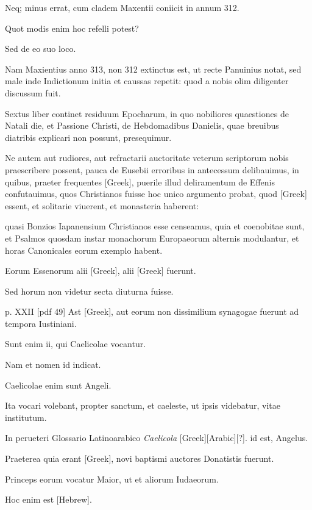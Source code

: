 \begin{parnumbers}
Neq; minus errat, cum cladem Maxentii coniicit in annum
312.

Quot modis enim hoc refelli potest?

Sed de eo suo loco.

Nam
Maxientius anno 313, non 312 extinctus est, ut recte Panuinius notat,
sed male inde Indictionum initia et caussas repetit: quod a nobis
olim diligenter discussum fuit.

Sextus liber continet residuum Epocharum,
in quo nobiliores quaestiones de Natali die, et Passione Christi,
de Hebdomadibus Danielis, quae breuibus diatribis explicari
non possunt, presequimur.

Ne autem aut rudiores, aut refractarii auctoritate
veterum scriptorum nobis praescribere possent, pauca de
Eusebii erroribus in antecessum delibauimus, in quibus, praeter frequentes
\textgreek{[Greek]}, puerile illud deliramentum de Effenis confutauimus,
quos Christianos fuisse hoc unico argumento probat, quod
\textgreek{[Greek]} essent, et solitarie viuerent, et monasteria haberent:

quasi Bonzios
Iapanensium Christianos esse censeamus, quia et coenobitae sunt,
et Psalmos quosdam instar monachorum Europaeorum alternis modulantur,
et horas Canonicales eorum exemplo habent.

Eorum Essenorum alii \textgreek{[Greek]}, alii \textgreek{[Greek]} fuerunt.

Sed horum non videtur
secta diuturna fuisse.

\clearpage
p. XXII [pdf 49]
Ast \textgreek{[Greek]}, aut eorum non dissimilium
synagogae fuerunt ad tempora Iustiniani.

Sunt enim ii, qui Caelicolae
vocantur.

Nam et nomen id indicat.

Caelicolae enim sunt
Angeli.

Ita vocari volebant, propter sanctum, et caeleste, ut ipsis videbatur,
vitae institutum.

In perueteri Glossario Latinoarabico \textit{Caelicola}
[Greek][Arabic][?]. id est, Angelus.

Praeterea quia erant \textgreek{[Greek]}, novi
baptismi auctores Donatistis fuerunt.

Princeps eorum vocatur
Maior, ut et aliorum Iudaeorum.

Hoc enim est \texthebrew{[Hebrew]}.


\end{parnumbers}
